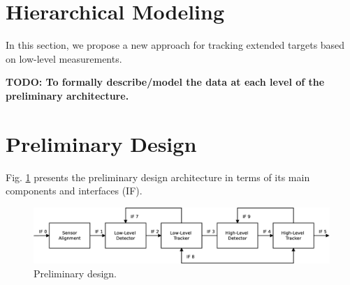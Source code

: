 \documentclass[letterpaper]{article}
\begin{document}
\section{Hierarchical Modeling}
\label{sec:hierarchical modeling}

In this section, we propose a new approach for tracking extended targets based on low-level measurements.

{\bf TODO: To formally describe/model the data at each level of the preliminary architecture.}

\section{Preliminary Design}
\label{sec:preliminary design}

Fig. \ref{fig:preliminary design} presents the preliminary design architecture in terms of its main components and interfaces (IF).

\begin{figure}[ht!]
\centering
\includegraphics[width=\textwidth]{images/preliminary_design.eps}
\caption{Preliminary design.}
\label{fig:preliminary design}
\end{figure}
\end{document}
